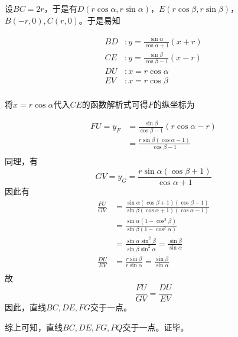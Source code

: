设$BC = 2r$，于是有$D(r\cos\alpha, r\sin\alpha)$，$E(r\cos\beta, r\sin\beta)$，$B(-r, 0), C(r, 0)$。于是易知

\begin{align*}
  BD&:y = \frac{\sin\alpha}{\cos\alpha + 1}(x + r) \\
  CE&:y = \frac{\sin\beta}{\cos\beta - 1}(x - r) \\
  DU&:x = r\cos\alpha \\
  EV&:x = r\cos\beta \\
\end{align*}

将$x = r\cos\alpha$代入$CE$的函数解析式可得$F$的纵坐标为

\begin{align*}
  FU = y_F &= \frac{\sin\beta}{\cos\beta - 1}(r\cos\alpha - r) \\
  &= \frac{r\sin\beta(\cos\alpha - 1)}{\cos\beta - 1} \\
\end{align*}
同理，有
\[ GV = y_G = \frac{r\sin\alpha(\cos\beta + 1)}{\cos\alpha + 1} \]
因此有
\begin{align*}
  \frac{FU}{GV} &= \frac{\sin\alpha(\cos\beta + 1)(\cos\beta - 1)}{\sin\beta(\cos\alpha + 1)(\cos\alpha - 1)} \\
  &= \frac{\sin\alpha(1 - \cos^2\beta)}{\sin\beta(1 - \cos^2\alpha)} \\
  &= \frac{\sin\alpha\sin^2\beta}{\sin\beta\sin^2\alpha} = \frac{\sin\beta}{\sin\alpha} \\
  \frac{DU}{EV} &= \frac{r\sin\beta}{r\sin\alpha} = \frac{\sin\beta}{\sin\alpha} \\
\end{align*}
故
\[ \frac{FU}{GV} = \frac{DU}{EV} \]
因此，直线$BC, DE, FG$交于一点。

综上可知，直线$BC, DE, FG, PQ$交于一点。证毕。
